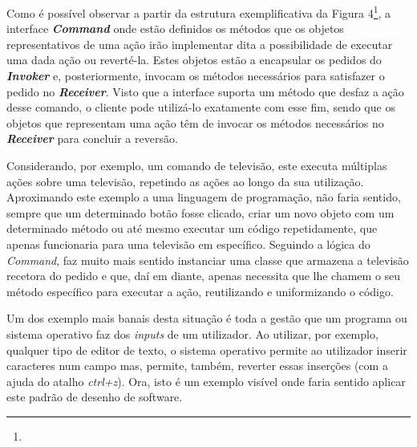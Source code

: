 \documentclass[10pt,portuguese]{article}
\begin{document}
\par Como é possível observar a partir da estrutura exemplificativa da Figura 4\footnote{}, a interface \textbf{\textit{Command}} onde estão definidos os métodos que os objetos representativos de uma ação irão implementar dita a possibilidade de executar uma dada ação ou reverté-la. Estes objetos estão a encapsular os pedidos do \textit{\textbf{Invoker}} e, posteriormente, invocam os métodos necessários para satisfazer o pedido no \textit{\textbf{Receiver}}. Visto que a interface suporta um método que desfaz a ação desse comando, o cliente pode utilizá-lo exatamente com esse fim, sendo que os objetos que representam uma ação têm de invocar os métodos necessários no \textit{\textbf{Receiver}} para concluir a reversão.

\par Considerando, por exemplo, um comando de televisão, este executa múltiplas ações sobre uma televisão, repetindo as ações ao longo da sua utilização. Aproximando este exemplo a uma linguagem de programação, não faria sentido, sempre que um determinado botão fosse clicado, criar um novo objeto com um determinado método ou até mesmo executar um código repetidamente, que apenas funcionaria para uma televisão em específico. 
Seguindo a lógica do \textit{Command}, faz muito mais sentido instanciar uma classe que armazena a televisão recetora do pedido e que, daí em diante, apenas necessita que lhe chamem o seu método específico para executar a ação, reutilizando e uniformizando o código. 

\par Um dos exemplo mais banais desta situação é toda a gestão que um programa ou sistema operativo faz dos \textit{inputs} de um utilizador. 
Ao utilizar, por exemplo, qualquer tipo de editor de texto, o sistema operativo permite ao utilizador inserir caracteres num campo mas, permite, também, reverter essas inserções (com a ajuda do atalho \textit{ctrl+z}). Ora, isto é um exemplo visível onde faria sentido aplicar este padrão de desenho de software.
\end{document}
